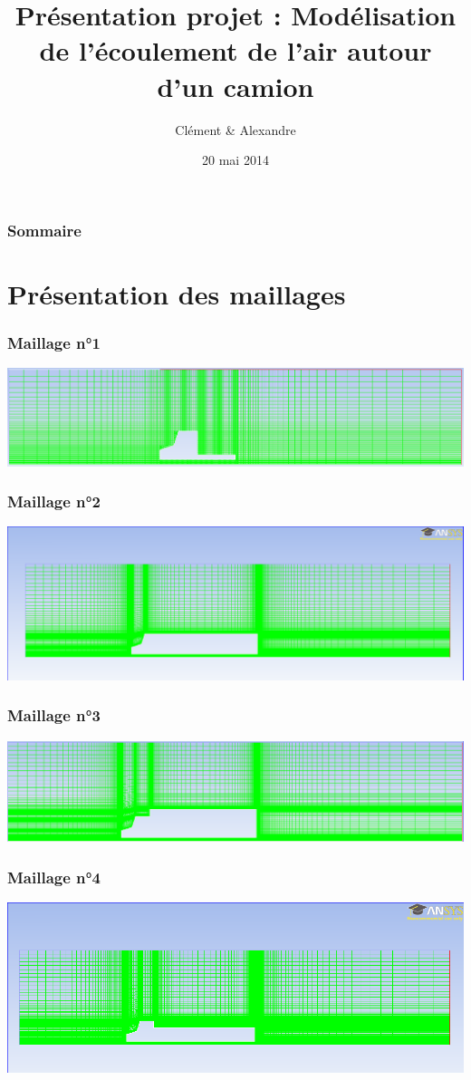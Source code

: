 \documentclass[handout]{beamer}
\title[MecaFlux]{Présentation projet : Modélisation de l'écoulement de l'air autour d'un camion}
\author{Clément \bsc{Rousseau} \& Alexandre \bsc{Vieira}}
\institute{INSA de Rouen}
\date{20 mai 2014}
\begin{document}
\begin{frame}
\titlepage
\end{frame}

\begin{frame}
	\frametitle{Sommaire}
	\tableofcontents
\end{frame}

\section[Maillages]{Présentation des maillages}
 
\begin{frame}
	\frametitle{Maillage n°1}
	\includegraphics[scale=0.38]{../images/camion_cabine_1.png}
\end{frame}

\begin{frame}
	\frametitle{Maillage n°2}
	\includegraphics[scale=0.3]{../images/remorque1_mesh.png}
\end{frame}

\begin{frame}
	\frametitle{Maillage n°3}
	\includegraphics[scale=0.35]{../images/camion_remorque_1.png}
\end{frame}

\begin{frame}
	\frametitle{Maillage n°4}
	\includegraphics[scale=0.38]{../images/remorque3_mesh.png}
\end{frame}
\end{document}
